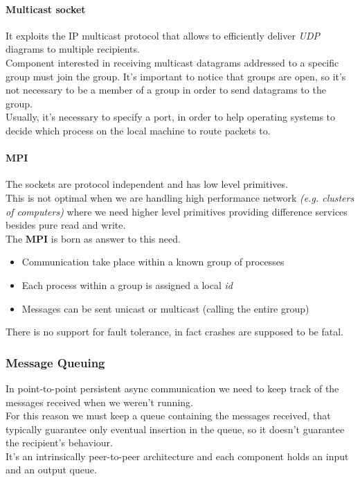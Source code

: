 \paragraph{Multicast socket}

It exploits the IP multicast protocol that allows to efficiently deliver \textit{UDP} diagrams to multiple recipients.\\
Component interested in receiving multicast datagrams addressed to a specific group must join the group. It's important to notice that groups are open, so it's not necessary to be a member of a group in order to send datagrams to the group.\\
Usually, it's necessary to specify a port, in order to help operating systems to decide which process on the local machine to route packets to.

\paragraph{MPI}

The sockets are protocol independent and has low level primitives.\\
This is not optimal when we are handling high performance network \textit{(e.g. clusters of computers)} where we need higher level primitives providing difference services besides pure read and write.\\
The \textbf{MPI} is born as answer to this need.
\begin{itemize}
    \item Communication take place within a known group of processes
    \item Each process within a group is assigned a local \emph{id}
    \item Messages can be sent unicast or multicast (calling the entire group)
\end{itemize}
There is no support for fault tolerance, in fact crashes are supposed to be fatal.

\subsubsection{Message Queuing}

In point-to-point persistent async communication we need to keep track of the messages received when we weren't running.\\
For this reason we must keep a queue containing the messages received, that typically guarantee only eventual insertion in the queue, so it doesn't guarantee the recipient's behaviour.\\
It's an intrinsically peer-to-peer architecture and each component holds an input and an output queue.

